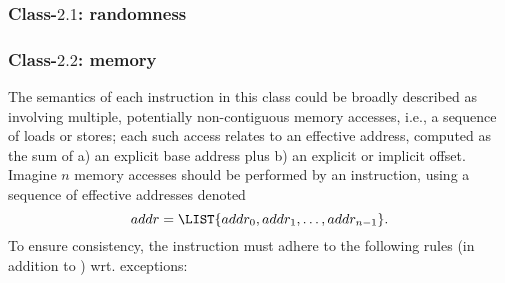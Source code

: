 
\subsubsection{Class-$2.1$: randomness}
\label{sec:spec:instruction:2:1}







\subsubsection{Class-$2.2$: memory}
\label{sec:spec:instruction:2:2}

The semantics of each instruction in this class could be broadly described 
as involving multiple, potentially non-contiguous memory accesses, i.e., a 
sequence of loads or stores; each such access relates to an effective
address, computed as the sum of 
a) an explicit             base address 
   plus
b) an explicit or implicit offset.
Imagine $n$ memory accesses should be performed by an instruction, using a 
sequence of effective addresses denoted
\[
addr = \LIST{ addr_0, addr_1, \ldots, addr_{n-1} } .
\]
To ensure consistency, the instruction must adhere to the following rules 
(in addition to ) wrt. exceptions:

